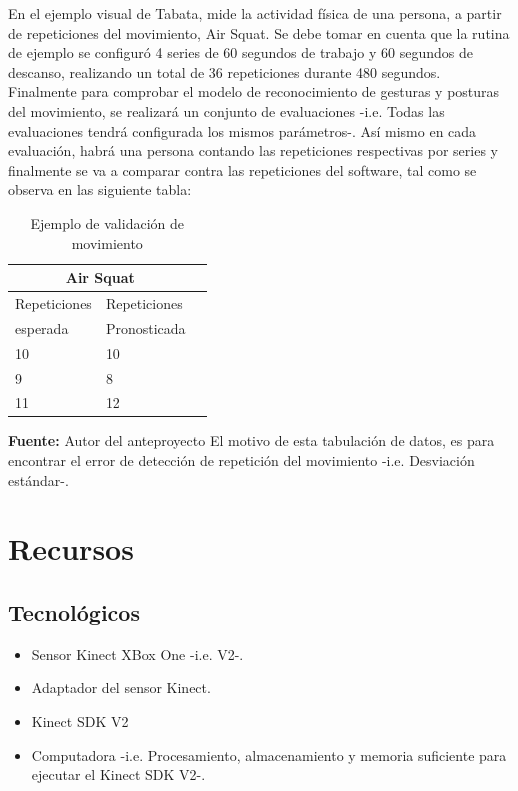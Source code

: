 \documentclass[twoside,twocolumn]{article}
\begin{document}
\medbreak
En el ejemplo visual de Tabata, mide la actividad física de una persona, a partir de repeticiones del movimiento, Air Squat. Se debe tomar en cuenta que la rutina de ejemplo se configuró 4 series de 60 segundos de trabajo y 60 segundos de descanso, realizando un total de 36 repeticiones durante 480 segundos.
\medbreak
Finalmente para comprobar el modelo de reconocimiento de gesturas y posturas del movimiento, se realizará un conjunto de evaluaciones -i.e. Todas las evaluaciones tendrá configurada los mismos parámetros-. 
\medbreak
Así mismo en cada evaluación, habrá una persona contando las repeticiones respectivas por series y finalmente se va a comparar contra las repeticiones del software, tal como se observa en las siguiente tabla:
\begin{table}[H]
\caption{Ejemplo de validación de movimiento}
\centering
\begin{tabular}{llr}
\toprule
\multicolumn{2}{c}{Air Squat} \\
\midrule
Repeticiones & Repeticiones \\
esperada &  Pronosticada \\
\midrule
10 & 10    \\
9 & 8    \\
11 & 12    \\
\bottomrule
\end{tabular}
\end{table}
\textbf{Fuente:} Autor del anteproyecto
\medbreak 
El motivo de esta tabulación de datos, es para encontrar el error de detección de repetición del movimiento -i.e. Desviación estándar-.

\section{Recursos}
\subsection{Tecnológicos}
\begin{itemize}
\item Sensor Kinect XBox One -i.e. V2-.
\item Adaptador del sensor Kinect.
\item Kinect SDK V2
\item Computadora -i.e. Procesamiento, almacenamiento y memoria suficiente para ejecutar el Kinect SDK V2-.
\end{itemize}
\end{document}
